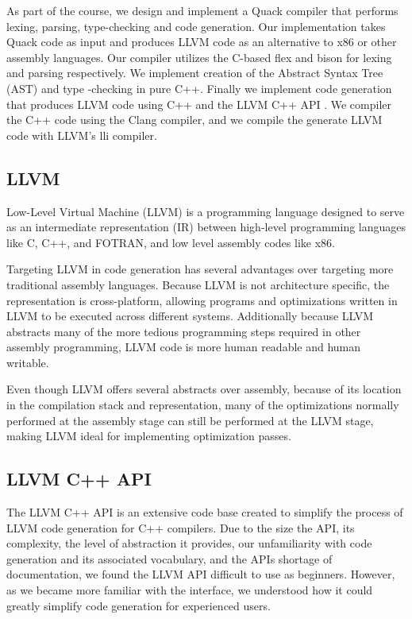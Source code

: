 \documentclass[11pt,journal]{IEEEtran}
\begin{document}
    As part of the course, we design and implement a Quack compiler that performs lexing,
    parsing, type-checking and code generation. Our implementation takes Quack code as
    input and produces LLVM code as an alternative to x86 or other assembly languages.
    Our compiler utilizes the C-based
    flex \cite{flex} and bison \cite{bison} for lexing and parsing respectively. We implement creation of the
    Abstract Syntax Tree (AST) and type -checking in pure C++. Finally we implement
    code generation that produces LLVM \cite{llvm} code using C++ and the LLVM C++ API
    \cite{llvm_api}. We compiler the C++ code using the Clang \cite{clang} compiler,
    and we compile the generate LLVM code with LLVM's lli compiler.

\subsection{LLVM}
    Low-Level Virtual Machine (LLVM) \cite{llvm} is a programming language designed
    to serve as an intermediate representation (IR) between high-level programming
    languages like C, C++, and FOTRAN, and low level assembly codes like x86.

    Targeting LLVM in code generation has several advantages over targeting
    more traditional assembly languages. Because LLVM is not architecture specific,
    the representation is cross-platform, allowing programs and optimizations
    written in LLVM to be executed across different systems. Additionally because LLVM
    abstracts many of the more tedious programming steps required in other assembly
    programming, LLVM code is more human readable and human writable.

    Even though LLVM offers several abstracts over assembly, because of its location
    in the compilation stack and representation, many of the optimizations normally
    performed at the assembly stage can still be performed at the LLVM stage,
    making LLVM ideal for implementing optimization passes.

\subsection{LLVM C++ API}

    The LLVM C++ API is an extensive code base created to simplify the process
    of LLVM code generation for C++ compilers. Due to the size the API, its
    complexity, the level of abstraction it provides, our unfamiliarity with
    code generation and its associated vocabulary, and the APIs shortage of documentation,
    we found the LLVM API difficult to use as beginners.
    However, as we became more familiar with the interface, we understood how
    it could greatly simplify code generation for experienced users.
\end{document}

